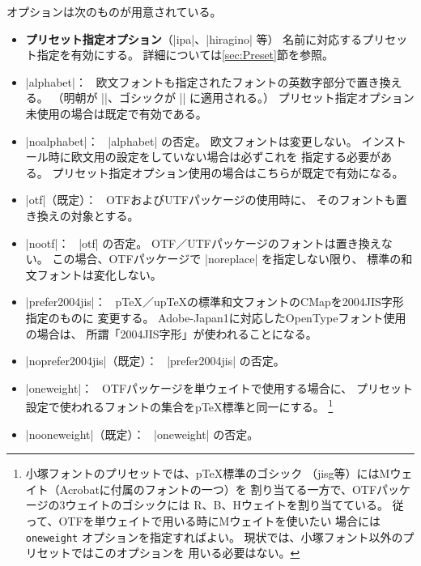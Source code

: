 \documentclass[a4paper,uplatex]{jsarticle}
\newcommand{\Pkg}[1]{\textsf{#1}}
\newcommand{\Means}{：\ }
\providecommand{\pTeX}{p\TeX}
\providecommand{\upTeX}{u\pTeX}
\begin{document}
オプションは次のものが用意されている。

\begin{itemize}
\item \textbf{プリセット指定オプション}（|ipa|、|hiragino| 等）
  名前に対応するプリセット指定を有効にする。
  詳細については\ref{sec:Preset}節を参照。
\item |alphabet|\Means
  欧文フォントも指定されたフォントの英数字部分で置き換える。
  （明朝が |\rmfamily|、ゴシックが |\sffamily| に適用される。）
  プリセット指定オプション未使用の場合は既定で有効である。
\item |noalphabet|\Means
  |alphabet| の否定。
  欧文フォントは変更しない。
  インストール時に欧文用の設定をしていない場合は必ずこれを
  指定する必要がある。
  プリセット指定オプション使用の場合はこちらが既定で有効になる。
\item |otf|（既定）\Means
  \Pkg{OTF}および\Pkg{UTF}パッケージの使用時に、
  そのフォントも置き換えの対象とする。
\item |nootf|\Means
  |otf| の否定。
  \Pkg{OTF}／\Pkg{UTF}パッケージのフォントは置き換えない。
  この場合、\Pkg{OTF}パッケージで |noreplace| を指定しない限り、
  標準の和文フォントは変化しない。
\item |prefer2004jis|\Means
  {\pTeX}／{\upTeX}の標準和文フォントのCMapを2004JIS字形指定のものに
  変更する。
  Adobe-Japan1に対応したOpenTypeフォント使用の場合は、
  所謂「2004JIS字形」が使われることになる。
\item |noprefer2004jis|（既定）\Means
  |prefer2004jis| の否定。
\item |oneweight|\Means
  \Pkg{OTF}パッケージを単ウェイトで使用する場合に、
  プリセット設定で使われるフォントの集合を{\pTeX}標準と同一にする。
  \<\footnote{小塚フォントのプリセットでは、{\pTeX}標準のゴシック
  （jisg等）にはMウェイト（Acrobatに付属のフォントの一つ）を
  割り当てる一方で、\Pkg{OTF}パッケージの3ウェイトのゴシックには
  R、B、Hウェイトを割り当てている。
  従って、\Pkg{OTF}を単ウェイトで用いる時にMウェイトを使いたい
  場合には \texttt{oneweight} オプションを指定すればよい。
  現状では、小塚フォント以外のプリセットではこのオプションを
  用いる必要はない。}
\item |nooneweight|（既定）\Means
  |oneweight| の否定。
\end{itemize}
\end{document}
